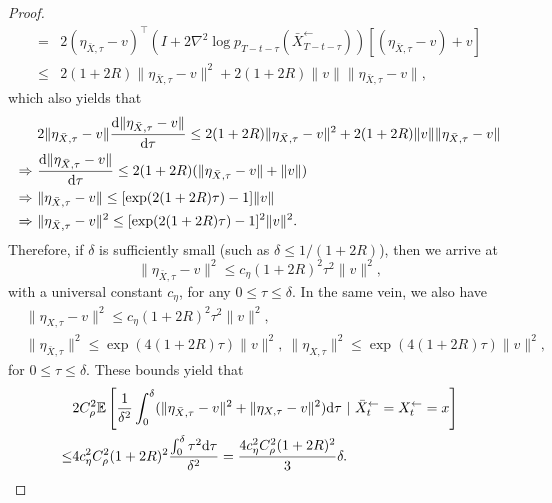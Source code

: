 \begin{proof}
\begin{align}
= & 2 (\eta_{\bar{X},\tau} - v)^\top (I + 2 \nabla^2 \log p_{T- t -\tau}(\bar{X}_{T - t -\tau}^\leftarrow)) [(\eta_{\bar{X},\tau} - v) + v] \\
\leq & 2 (1 + 2 R) \|\eta_{\bar{X},\tau} - v\|^2 +   2 (1 + 2R) \|v\| \|\eta_{\bar{X},\tau} - v\|, 
\end{align}
which also yields that  
\begin{align}
&2 \|\eta_{\bar{X},\tau} - v\| \frac{{\textnormal{d}} \|\eta_{\bar{X},\tau} - v\|}{{\textnormal{d}} \tau}  \leq  2(1+ 2 R) \|\eta_{\bar{X},\tau} - v\|^2 +    2(1+ 2 R) \|v\| \|\eta_{\bar{X},\tau} - v\| \\
\Rightarrow~ 
&\frac{{\textnormal{d}} \|\eta_{\bar{X},\tau} - v\|}{{\textnormal{d}} \tau}  \leq   2(1+ 2 R) (\|\eta_{\bar{X},\tau} - v\| +  \|v\|)  \\
\Rightarrow ~& \|\eta_{\bar{X},\tau} - v\| \leq [\exp( 2 (1+ 2 R) \tau) - 1]\|v\| \\
\Rightarrow ~& \|\eta_{\bar{X},\tau} - v\|^2 \leq [\exp( 2 (1+ 2 R) \tau) - 1]^2\|v\|^2.
\end{align}
Therefore, if $\delta$ is sufficiently small (such as $\delta \leq 1/(1 + 2R)$), then we arrive at 
$$
\|\eta_{\bar{X},\tau} - v\|^2 \leq c_\eta (1+ 2 R)^2 \tau^2\|v\|^2,
$$
with a universal constant $c_\eta$, for any $0 \leq \tau \leq \delta$. 
In the same vein, we also have 
\begin{align}
& \|\eta_{{X},\tau} - v\|^2 \leq c_\eta (1+ 2 R)^2 \tau^2\|v\|^2,~ \\
& \|\eta_{\bar{X},\tau}\|^2 \leq \exp(4(1+2R)\tau) \|v\|^2,~
\|\eta_{{X},\tau}\|^2 \leq \exp(4(1+2R)\tau) \|v\|^2,
\end{align}
for $0 \leq \tau \leq \delta$. 
These bounds yield that  
\begin{align}
& 2 C_\rho^2  \mathbb{E}\left[ \frac{1}{\delta^2} \int_{0}^\delta (\| \eta_{\bar{X},\tau} - v\|^2 + \| \eta_{{X},\tau} - v\|^2) {\textnormal{d}} \tau  ~|~\bar{X}_{t}^\leftarrow = {X}_{t}^\leftarrow =x\right] \\
\leq & 4 c_\eta^2  C_\rho^2 (1+2R)^2  \frac{\int_0^\delta \tau^2 {\textnormal{d}} \tau}{\delta^2} = 
\frac{4 c_\eta^2  C_\rho^2 (1+2R)^2}{3}\delta. 
\end{align}


\end{proof}
